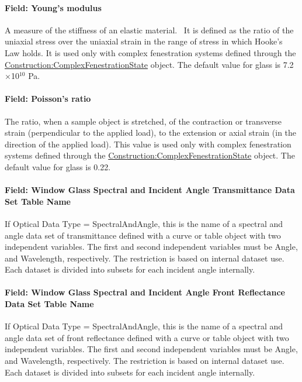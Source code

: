 \paragraph{Field: Young's modulus}\label{field-youngs-modulus}

A measure of the stiffness of an elastic material.~ It is defined as the ratio of the uniaxial stress over the uniaxial strain in the range of stress in which Hooke's Law holds. It is used only with complex fenestration systems defined through the \hyperref[constructioncomplexfenestrationstate]{Construction:ComplexFenestrationState} object. The default value for glass is 7.2$\times$10$^{10}$ Pa.

\paragraph{Field: Poisson's ratio}\label{field-poissons-ratio}

The ratio, when a sample object is stretched, of the contraction or transverse strain (perpendicular to the applied load), to the extension or axial strain (in the direction of the applied load). This value is used only with complex fenestration systems defined through the \hyperref[constructioncomplexfenestrationstate]{Construction:ComplexFenestrationState} object. The default value for glass is 0.22.

\paragraph{Field: Window Glass Spectral and Incident Angle Transmittance Data Set Table Name}\label{field-window-glass-spectral-and-incident-angle-transmittance-data}

If Optical Data Type = SpectralAndAngle, this is the name of a spectral and angle data set of transmittance defined with a curve or table object with two independent variables. The first and second independent variables must be Angle, and Wavelength, respectively. The restriction is based on internal dataset use. Each dataset is divided into subsets for each incident angle internally.

\paragraph{Field: Window Glass Spectral and Incident Angle Front Reflectance Data Set Table Name}\label{field-window-glass-spectral-and-incident-angle-front-reflectance-data}

If Optical Data Type = SpectralAndAngle, this is the name of a spectral and angle data set of front reflectance defined with a curve or table object with two independent variables. The first and second independent variables must be Angle, and Wavelength, respectively. The restriction is based on internal dataset use. Each dataset is divided into subsets for each incident angle internally.

